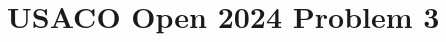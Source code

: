 \documentclass[a4paper, 12pt]{article}
\begin{document}
\section*{USACO Open 2024 Problem 3}

\begin{chirpbox}
\begin{problem}
\end{problem}
\end{chirpbox}

\begin{observation}
\end{observation}

\begin{solution}
\end{solution}
\end{document}
